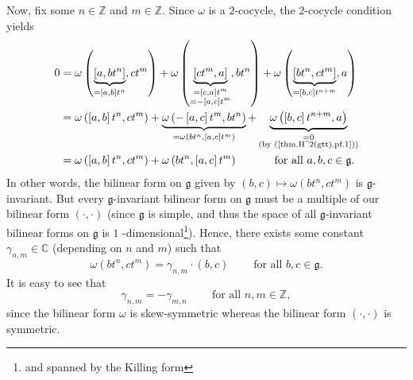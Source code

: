 \documentclass
[numbers=enddot,12pt,final,onecolumn,german,notitlepage]{scrartcl}%
\theoremstyle{definition}
\begin{document}
Now, fix some $n\in\mathbb{Z}$ and $m\in\mathbb{Z}$. Since $\omega$ is a
$2$-cocycle, the $2$-cocycle condition yields%
\begin{align*}
0  &  =\omega\left(  \underbrace{\left[  a,bt^{n}\right]  }_{=\left[
a,b\right]  t^{n}},ct^{m}\right)  +\omega\left(  \underbrace{\left[
ct^{m},a\right]  }_{\substack{=\left[  c,a\right]  t^{m}\\=-\left[
a,c\right]  t^{m}}},bt^{n}\right)  +\omega\left(  \underbrace{\left[
bt^{n},ct^{m}\right]  }_{=\left[  b,c\right]  t^{n+m}},a\right) \\
&  =\omega\left(  \left[  a,b\right]  t^{n},ct^{m}\right)  +\underbrace{\omega
\left(  -\left[  a,c\right]  t^{m},bt^{n}\right)  }_{=\omega\left(
bt^{n},\left[  a,c\right]  t^{m}\right)  }+\underbrace{\omega\left(  \left[
b,c\right]  t^{n+m},a\right)  }_{\substack{=0\\\text{(by
(\ref{thm.H^2(gtt).pf.1}))}}}\\
&  =\omega\left(  \left[  a,b\right]  t^{n},ct^{m}\right)  +\omega\left(
bt^{n},\left[  a,c\right]  t^{m}\right)  \ \ \ \ \ \ \ \ \ \ \text{for all
}a,b,c\in\mathfrak{g}\text{.}%
\end{align*}
In other words, the bilinear form on $\mathfrak{g}$ given by $\left(
b,c\right)  \mapsto\omega\left(  bt^{n},ct^{m}\right)  $ is $\mathfrak{g}%
$-invariant. But every $\mathfrak{g}$-invariant bilinear form on
$\mathfrak{g}$ must be a multiple of our bilinear form $\left(  \cdot
,\cdot\right)  $ (since $\mathfrak{g}$ is simple, and thus the space of all
$\mathfrak{g}$-invariant bilinear forms on $\mathfrak{g}$ is $1$%
-dimensional\footnote{and spanned by the Killing form}). Hence, there exists
some constant $\gamma_{n,m}\in\mathbb{C}$ (depending on $n$ and $m$) such
that
\begin{equation}
\omega\left(  bt^{n},ct^{m}\right)  =\gamma_{n,m}\cdot\left(  b,c\right)
\ \ \ \ \ \ \ \ \ \ \text{for all }b,c\in\mathfrak{g}.
\label{thm.H^2(gtt).pf.2}%
\end{equation}
It is easy to see that%
\begin{equation}
\gamma_{n,m}=-\gamma_{m,n}\ \ \ \ \ \ \ \ \ \ \text{for all }n,m\in\mathbb{Z},
\label{thm.H^2(gtt).pf.3}%
\end{equation}
since the bilinear form $\omega$ is skew-symmetric whereas the bilinear form
$\left(  \cdot,\cdot\right)  $ is symmetric.
\end{document}
